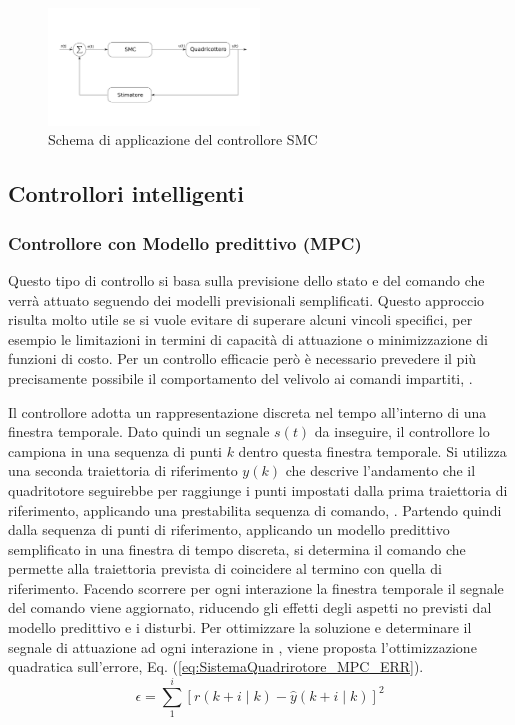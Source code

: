 \begin{figure}
	\centering
	\includegraphics[width=0.5\textwidth]{SistemaQuadrirotore/Figure/SMC}
	\caption{Schema di applicazione del controllore SMC}
\end{figure}

\subsection{Controllori intelligenti}

\subsubsection{Controllore con Modello predittivo (MPC)}

Questo tipo di controllo si basa sulla previsione dello stato e del comando che verrà attuato seguendo dei modelli previsionali semplificati. Questo approccio risulta molto utile se si vuole evitare di superare alcuni vincoli specifici, per esempio le limitazioni in termini di capacità di attuazione o minimizzazione di funzioni di costo. Per un controllo efficacie però è necessario prevedere il più precisamente possibile il comportamento del velivolo ai comandi impartiti, \cite{KimJinho2020ACSo}.

Il controllore adotta un rappresentazione discreta nel tempo all'interno di una finestra temporale. Dato quindi un segnale $s(t)$ da inseguire, il controllore lo campiona in una sequenza di punti $k$ dentro questa finestra temporale. Si utilizza una seconda traiettoria di riferimento $y(k)$ che descrive l'andamento che il quadritotore seguirebbe per raggiunge i punti impostati dalla prima traiettoria di riferimento, applicando una prestabilita sequenza di comando, \cite{AbdolhosseiniM2013AEMP}. 
Partendo quindi dalla sequenza di punti di riferimento, applicando un modello predittivo semplificato in una finestra di tempo discreta, si determina il comando che permette alla traiettoria prevista di coincidere al termino con quella di riferimento. Facendo scorrere per ogni interazione la finestra temporale il segnale del comando viene aggiornato, riducendo gli effetti degli aspetti no previsti dal modello predittivo e i disturbi.
Per ottimizzare la soluzione e determinare il segnale di attuazione ad ogni interazione in \cite{AbdolhosseiniM2013AEMP}, viene proposta l'ottimizzazione quadratica sull'errore, Eq. (\ref{eq:SistemaQuadrirotore_MPC_ERR}).
\begin{equation}\label{eq:SistemaQuadrirotore_MPC_ERR}
	\epsilon = \sum_{1}^{i} \left[r(k+i \mid k) - \hat{y}(k+i \mid k)\right]^2
\end{equation}

